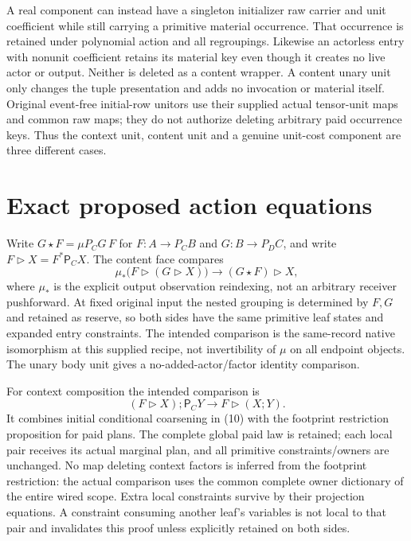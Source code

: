 \documentclass[11pt]{article}
\begin{document}
A real component can instead have a singleton initializer raw carrier and unit coefficient while still carrying a primitive material occurrence. That occurrence is retained under polynomial action and all regroupings. Likewise an actorless entry with nonunit coefficient retains its material key even though it creates no live actor or output. Neither is deleted as a content wrapper. A content unary unit only changes the tuple presentation and adds no invocation or material itself. Original event-free initial-row unitors use their supplied actual tensor-unit maps and common raw maps; they do not authorize deleting arbitrary paid occurrence keys. Thus the context unit, content unit and a genuine unit-cost component are three different cases.

\section{Exact proposed action equations}
Write $G\star F=\mu P_CG\,F$ for $F:A\to P_CB$ and $G:B\to P_DC$, and write $F\triangleright X=F^*\mathsf P_CX$. The content face compares
\[
 \mu_*\bigl(F\triangleright(G\triangleright X)\bigr)
       \longrightarrow (G\star F)\triangleright X,             \tag{12}
\]
where $\mu_*$ is the explicit output observation reindexing, not an arbitrary receiver pushforward. At fixed original input the nested grouping is determined by $F,G$ and retained as reserve, so both sides have the same primitive leaf states and expanded entry constraints. The intended comparison is the same-record native isomorphism at this supplied recipe, not invertibility of $\mu$ on all endpoint objects. The unary body unit gives a no-added-actor/factor identity comparison.

For context composition the intended comparison is
\[
 (F\triangleright X);\mathsf P_CY
            \longrightarrow F\triangleright(X;Y).             \tag{13}
\]
It combines initial conditional coarsening in (10) with the footprint restriction proposition for paid plans. The complete global paid law is retained; each local pair receives its actual marginal plan, and all primitive constraints/owners are unchanged. No map deleting context factors is inferred from the footprint restriction: the actual comparison uses the common complete owner dictionary of the entire wired scope. Extra local constraints survive by their projection equations. A constraint consuming another leaf's variables is not local to that pair and invalidates this proof unless explicitly retained on both sides.
\end{document}
